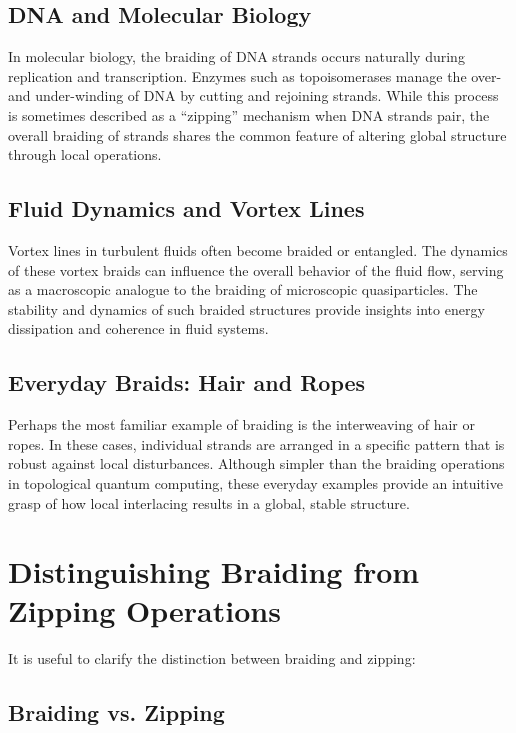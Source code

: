 \documentclass[12pt]{article}
\begin{document}
\subsection{DNA and Molecular Biology}

In molecular biology, the braiding of DNA strands occurs naturally during replication and transcription. Enzymes such as topoisomerases manage the over- and under-winding of DNA by cutting and rejoining strands. While this process is sometimes described as a “zipping” mechanism when DNA strands pair, the overall braiding of strands shares the common feature of altering global structure through local operations.

\subsection{Fluid Dynamics and Vortex Lines}

Vortex lines in turbulent fluids often become braided or entangled. The dynamics of these vortex braids can influence the overall behavior of the fluid flow, serving as a macroscopic analogue to the braiding of microscopic quasiparticles. The stability and dynamics of such braided structures provide insights into energy dissipation and coherence in fluid systems.

\subsection{Everyday Braids: Hair and Ropes}

Perhaps the most familiar example of braiding is the interweaving of hair or ropes. In these cases, individual strands are arranged in a specific pattern that is robust against local disturbances. Although simpler than the braiding operations in topological quantum computing, these everyday examples provide an intuitive grasp of how local interlacing results in a global, stable structure.

\section{Distinguishing Braiding from Zipping Operations}

It is useful to clarify the distinction between braiding and zipping:

\subsection{Braiding vs. Zipping}
\end{document}
